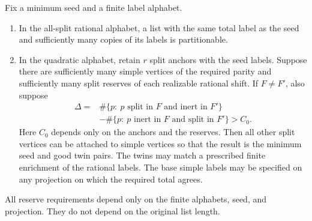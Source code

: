 \begin{lemma}\label{pw:reserves}
Fix a minimum seed and a finite label alphabet.
\begin{enumerate}
\item In the all-split rational alphabet, a list with the same total label
as the seed and sufficiently many copies of its labels is partitionable.
\item In the quadratic alphabet, retain $r$ split anchors with the seed
labels.  Suppose there are sufficiently many simple vertices of the required
parity and sufficiently many split reserves of each realizable rational
shift.  If $F\ne F'$, also suppose
\begin{equation}\label{pw:donor-balance}
 \begin{aligned}
 \Delta={}&\#\{p:\ p\text{ split in }F\text{ and inert in }F'\}\\
       &-\#\{p:\ p\text{ inert in }F\text{ and split in }F'\}>C_0.
 \end{aligned}
\end{equation}
Here $C_0$ depends only on the anchors and the reserves.  Then all other
split vertices can be attached to simple vertices so that the result is
the minimum seed and good twin pairs.  The twins may match a prescribed
finite enrichment of the rational labels.  The base simple labels may be
specified on any projection on which the required total agrees.
\end{enumerate}
All reserve requirements depend only on the finite alphabets, seed, and
projection.  They do not depend on the original list length.
\end{lemma}

